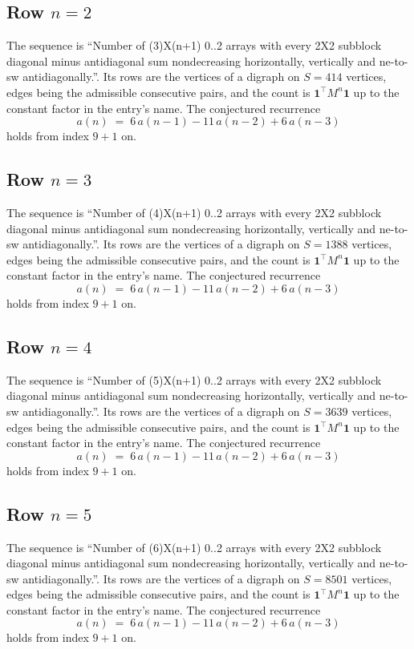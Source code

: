 \documentclass[11pt,a4paper]{article}
\theoremstyle{plain}
\theoremstyle{definition}
\begin{document}
\subsection*{Row $n$$=2$}
The sequence is ``Number of (3)X(n+1) 0..2 arrays with every 2X2 subblock diagonal minus antidiagonal sum nondecreasing horizontally, vertically and ne-to-sw antidiagonally.''. Its rows are the vertices of a digraph on
$S=414$ vertices, edges being the admissible consecutive pairs, and the count is
$\mathbf{1}^{\!\top}M^{n}\mathbf{1}$ up to the constant factor in the entry's name.
The conjectured recurrence
\[
a(n)\;=\;6\,a(n-1) - 11\,a(n-2) + 6\,a(n-3)
\]
holds from index $9+1$ on.

\subsection*{Row $n$$=3$}
The sequence is ``Number of (4)X(n+1) 0..2 arrays with every 2X2 subblock diagonal minus antidiagonal sum nondecreasing horizontally, vertically and ne-to-sw antidiagonally.''. Its rows are the vertices of a digraph on
$S=1388$ vertices, edges being the admissible consecutive pairs, and the count is
$\mathbf{1}^{\!\top}M^{n}\mathbf{1}$ up to the constant factor in the entry's name.
The conjectured recurrence
\[
a(n)\;=\;6\,a(n-1) - 11\,a(n-2) + 6\,a(n-3)
\]
holds from index $9+1$ on.

\subsection*{Row $n$$=4$}
The sequence is ``Number of (5)X(n+1) 0..2 arrays with every 2X2 subblock diagonal minus antidiagonal sum nondecreasing horizontally, vertically and ne-to-sw antidiagonally.''. Its rows are the vertices of a digraph on
$S=3639$ vertices, edges being the admissible consecutive pairs, and the count is
$\mathbf{1}^{\!\top}M^{n}\mathbf{1}$ up to the constant factor in the entry's name.
The conjectured recurrence
\[
a(n)\;=\;6\,a(n-1) - 11\,a(n-2) + 6\,a(n-3)
\]
holds from index $9+1$ on.

\subsection*{Row $n$$=5$}
The sequence is ``Number of (6)X(n+1) 0..2 arrays with every 2X2 subblock diagonal minus antidiagonal sum nondecreasing horizontally, vertically and ne-to-sw antidiagonally.''. Its rows are the vertices of a digraph on
$S=8501$ vertices, edges being the admissible consecutive pairs, and the count is
$\mathbf{1}^{\!\top}M^{n}\mathbf{1}$ up to the constant factor in the entry's name.
The conjectured recurrence
\[
a(n)\;=\;6\,a(n-1) - 11\,a(n-2) + 6\,a(n-3)
\]
holds from index $9+1$ on.
\end{document}
